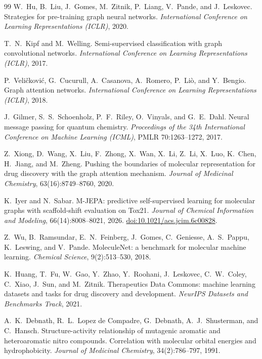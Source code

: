 \begin{thebibliography}{99}
 W.~Hu, B.~Liu, J.~Gomes, M.~Zitnik, P.~Liang, V.~Pande,
and J.~Leskovec. Strategies for pre-training graph neural networks.
\emph{International Conference on Learning Representations (ICLR)}, 2020.

 T.~N.~Kipf and M.~Welling. Semi-supervised classification with
graph convolutional networks. \emph{International Conference on Learning
Representations (ICLR)}, 2017.

 P.~Veli\v{c}kovi\'c, G.~Cucurull, A.~Casanova, A.~Romero,
P.~Li\`o, and Y.~Bengio. Graph attention networks. \emph{International
Conference on Learning Representations (ICLR)}, 2018.

 J.~Gilmer, S.~S.~Schoenholz, P.~F.~Riley, O.~Vinyals, and
G.~E.~Dahl. Neural message passing for quantum chemistry. \emph{Proceedings of
the 34th International Conference on Machine Learning (ICML)}, PMLR
70:1263--1272, 2017.

 Z.~Xiong, D.~Wang, X.~Liu, F.~Zhong, X.~Wan, X.~Li,
Z.~Li, X.~Luo, K.~Chen, H.~Jiang, and M.~Zheng. Pushing the boundaries of
molecular representation for drug discovery with the graph attention mechanism.
\emph{Journal of Medicinal Chemistry}, 63(16):8749--8760, 2020.

 K.~Iyer and N.~Sabar. M-JEPA: predictive self-supervised
learning for molecular graphs with scaffold-shift evaluation on Tox21.
\emph{Journal of Chemical Information and Modeling}, 66(14):8008--8021, 2026.
\href{https://doi.org/10.1021/acs.jcim.6c00828}{doi:10.1021/acs.jcim.6c00828}.

 Z.~Wu, B.~Ramsundar, E.~N.~Feinberg, J.~Gomes,
C.~Geniesse, A.~S.~Pappu, K.~Leswing, and V.~Pande. MoleculeNet: a benchmark
for molecular machine learning. \emph{Chemical Science}, 9(2):513--530, 2018.

 K.~Huang, T.~Fu, W.~Gao, Y.~Zhao, Y.~Roohani, J.~Leskovec,
C.~W.~Coley, C.~Xiao, J.~Sun, and M.~Zitnik. Therapeutics Data Commons:
machine learning datasets and tasks for drug discovery and development.
\emph{NeurIPS Datasets and Benchmarks Track}, 2021.

 A.~K.~Debnath, R.~L.~Lopez de Compadre, G.~Debnath,
A.~J.~Shusterman, and C.~Hansch. Structure-activity relationship of mutagenic
aromatic and heteroaromatic nitro compounds. Correlation with molecular orbital
energies and hydrophobicity. \emph{Journal of Medicinal Chemistry},
34(2):786--797, 1991.


\end{thebibliography}
